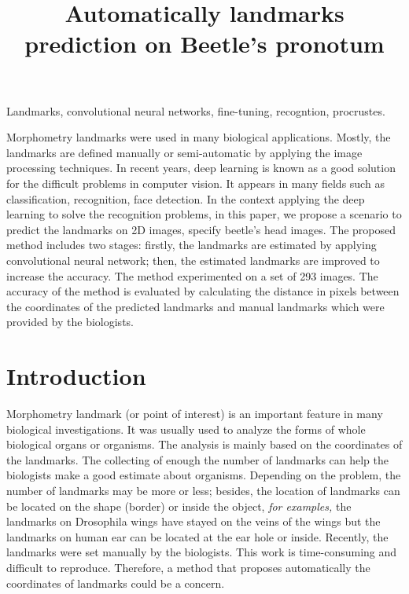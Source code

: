 \documentclass[10pt]{article}
\begin{document}
\noindent



\title{Automatically landmarks prediction on Beetle's pronotum}




\maketitle

\keywords
Landmarks, convolutional neural networks, fine-tuning, recogntion, procrustes.

\abstract
Morphometry landmarks were used in many biological applications. Mostly, the landmarks are defined manually or semi-automatic by applying the image processing techniques. In recent years, deep learning is known as a good solution for the difficult problems in computer vision. It appears in many fields such as classification, recognition, face detection. In the context applying the deep learning to solve the recognition problems, in this paper, we propose a scenario to predict the landmarks on 2D images, specify beetle's head images. The proposed method includes two stages: firstly, the landmarks are estimated by applying convolutional neural network; then, the estimated landmarks are improved to increase the accuracy. The method experimented on a set of 293 images. The accuracy of the method is evaluated by calculating the distance in pixels between the coordinates of the predicted landmarks and manual landmarks which were provided by the biologists.

\section{Introduction}
Morphometry landmark (or point of interest) is an important feature in many biological investigations. It was usually used to analyze the forms of whole biological organs or organisms. The analysis is mainly based on the coordinates of the landmarks. The collecting of enough the number of landmarks can help the biologists make a good estimate about organisms. Depending on the problem, the number of landmarks may be more or less; besides, the location of landmarks can be located on the shape (border) or inside the object, \textit{for examples,} the landmarks on Drosophila wings have stayed on the veins of the wings but the landmarks on human ear can be located at the ear hole or inside. Recently, the landmarks were set manually by the biologists. This work is time-consuming and difficult to reproduce. Therefore, a method that proposes automatically the coordinates of landmarks could be a concern. 
\end{document}
